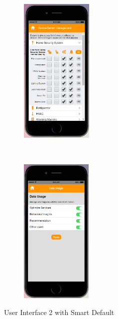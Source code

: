 \begin{appendices}
\begin{figure}
\begin{subfigure}[t]{0.2\textwidth}
	\end{subfigure}%
	~~~~~
	\begin{subfigure}[t]{0.2\textwidth}
		\centering
		\includegraphics[height=2.8in]{figures/ui2sd4.png}
	\end{subfigure}%
	~~~~~
	\begin{subfigure}[t]{0.2\textwidth}
		\centering
		\includegraphics[height=2.8in]{figures/ui2sd5.png}
	\end{subfigure}%
	\caption{User Interface 2 with Smart Default}
	\label{fig:ui2SD}
\end{figure}


\end{appendices}
